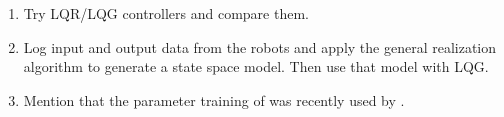 \begin{enumerate}
\item Try LQR/LQG controllers and compare them.
\item Log input and output data from the robots and apply the general realization algorithm \cite{deCallafonGRA08} to generate a state space model. Then use that model with LQG.
\item Mention that the parameter training of \cite{Abbeel05discriminativetraining} was recently used by \cite{SakaiKuroda10}.
\end{enumerate}
